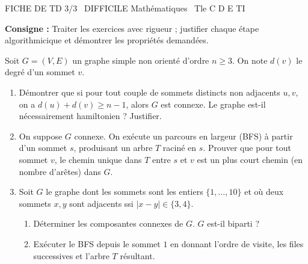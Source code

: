 \documentclass[11pt]{article}
\begin{document}
\begin{tcolorbox}[enhanced,colback=popink,colframe=popink,arc=10pt,boxrule=0pt,left=12pt,right=12pt,top=9pt,bottom=9pt]
{\color{white}\popxbold\small FICHE DE TD 3/3 \textbullet\ DIFFICILE \hfill Mathématiques \textbullet\ Tle C D E TI\par}
\end{tcolorbox}
\vspace{4pt}
\noindent \textbf{Consigne :} Traiter les exercices avec rigueur ; justifier chaque étape algorithmicique et démontrer les propriétés demandées.

\begin{exercice}
Soit $G=(V,E)$ un graphe simple non orienté d'ordre $n \ge 3$. On note $d(v)$ le degré d'un sommet $v$.
\begin{enumerate}
    \item Démontrer que si pour tout couple de sommets distincts non adjacents $u,v$, on a $d(u)+d(v) \ge n-1$, alors $G$ est connexe. Le graphe est-il nécessairement hamiltonien ? Justifier.
    \item On suppose $G$ connexe. On exécute un parcours en largeur (BFS) à partir d'un sommet $s$, produisant un arbre $T$ raciné en $s$. Prouver que pour tout sommet $v$, le chemin unique dans $T$ entre $s$ et $v$ est un plus court chemin (en nombre d'arêtes) dans $G$.
    \item Soit $G$ le graphe dont les sommets sont les entiers $\{1, \dots, 10\}$ et où deux sommets $x,y$ sont adjacents ssi $|x-y| \in \{3, 4\}$. 
    \begin{enumerate}
        \item Déterminer les composantes connexes de $G$. $G$ est-il biparti ?
        \item Exécuter le BFS depuis le sommet $1$ en donnant l'ordre de visite, les files successives et l'arbre $T$ résultant.
    \end{enumerate}
\end{enumerate}
\end{exercice}
\end{document}
